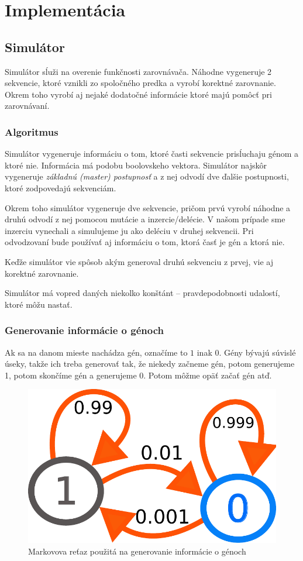 \chapter{Implementácia}

\section{Simulátor}

Simulátor sĺuži na overenie funkčnosti zarovnávača. Náhodne vygeneruje 2 sekvencie, ktoré vznikli zo spoločného predka a vyrobí korektné zarovnanie. Okrem toho vyrobí aj nejaké dodatočné informácie ktoré majú pomôcť pri zarovnávaní.

\subsection{Algoritmus}
Simulátor vygeneruje informáciu o tom, ktoré časti sekvencie prisĺuchaju génom a ktoré nie. Informácia má podobu boolovskeho vektora.
Simulátor najskôr vygeneruje \textit{základnú (master) postupnosť} a z nej odvodí dve ďalšie postupnosti, ktoré zodpovedajú sekvenciám.

Okrem toho simulátor vygeneruje dve sekvencie, pričom prvú vyrobí náhodne a druhú odvodí z nej pomocou mutácie a inzercie/delécie.
V našom prípade sme inzerciu vynechali a simulujeme ju ako deléciu v druhej sekvencii.
Pri odvodzovaní bude používať aj informáciu o tom, ktorá časť je gén a ktorá nie.

Keďže simulátor vie spôsob akým generoval druhú sekvenciu z prvej, vie aj korektné zarovnanie.

Simulátor má vopred daných niekolko konštánt -- pravdepodobnosti udalostí, ktoré môžu nastať.

\subsection{Generovanie informácie o génoch}
Ak sa na danom mieste nachádza gén, označíme to $1$ inak $0$.
Gény bývajú súvislé úseky, takže ich treba generovať tak, že niekedy začneme gén, potom generujeme 1, potom skončíme gén a generujeme 0. Potom môžme opäť začať gén atď.

\begin{figure}[htp]
    \centering
    \includegraphics[width=.3\textwidth]{images/markov_chain}
    \caption{Markovova reťaz použitá na generovanie informácie o génoch}
    \label{fig:markov-chain}
\end{figure}

